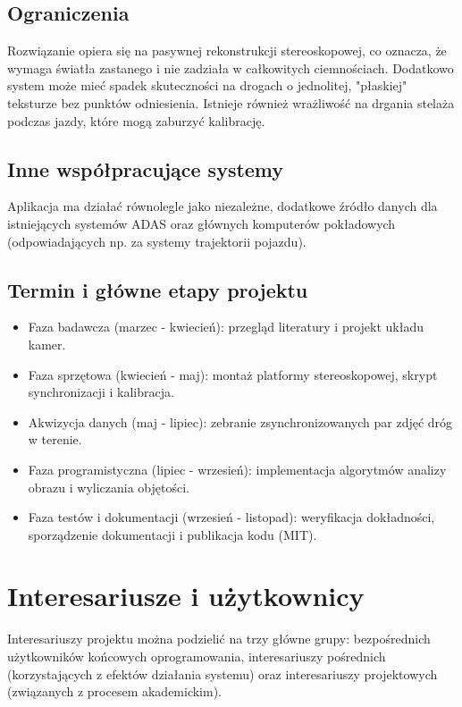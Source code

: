 \documentclass[11pt, a4paper]{article}
\begin{document}
\subsection{Ograniczenia}
Rozwiązanie opiera się na pasywnej rekonstrukcji stereoskopowej, co oznacza, że wymaga światła zastanego i nie zadziała w całkowitych ciemnościach. Dodatkowo system może mieć spadek skuteczności na drogach o jednolitej, "płaskiej" teksturze bez punktów odniesienia. Istnieje również wrażliwość na drgania stelaża podczas jazdy, które mogą zaburzyć kalibrację.

\subsection{Inne współpracujące systemy}
Aplikacja ma działać równolegle jako niezależne, dodatkowe źródło danych dla istniejących systemów ADAS oraz głównych komputerów pokładowych (odpowiadających np. za systemy trajektorii pojazdu).

\subsection{Termin i główne etapy projektu}
\begin{itemize}
    \item Faza badawcza (marzec - kwiecień): przegląd literatury i projekt układu kamer.
    \item Faza sprzętowa (kwiecień - maj): montaż platformy stereoskopowej, skrypt synchronizacji i kalibracja.
    \item Akwizycja danych (maj - lipiec): zebranie zsynchronizowanych par zdjęć dróg w terenie.
    \item Faza programistyczna (lipiec - wrzesień): implementacja algorytmów analizy obrazu i wyliczania objętości.
    \item Faza testów i dokumentacji (wrzesień - listopad): weryfikacja dokładności, sporządzenie dokumentacji i publikacja kodu (MIT).
\end{itemize}

\section{Interesariusze i użytkownicy}
Interesariuszy projektu można podzielić na trzy główne grupy: bezpośrednich użytkowników końcowych oprogramowania, interesariuszy pośrednich (korzystających z efektów działania systemu) oraz interesariuszy projektowych (związanych z procesem akademickim).
\end{document}

